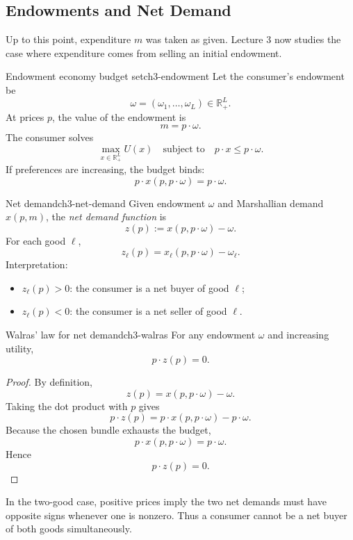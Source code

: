 \subsection{Endowments and Net Demand}

Up to this point, expenditure $m$ was taken as given. Lecture 3 now studies the case where expenditure comes from selling an initial endowment.

\begin{definition}{Endowment economy budget set}{ch3-endowment}
Let the consumer's endowment be
\[
\omega=(\omega_1,\dots,\omega_L)\in \mathbb{R}_+^L.
\]
At prices $p$, the value of the endowment is
\[
m=p\cdot \omega.
\]
The consumer solves
\[
\max_{x\in \mathbb{R}_+^L} U(x)
\quad \text{subject to} \quad
p\cdot x \le p\cdot \omega.
\]
If preferences are increasing, the budget binds:
\[
p\cdot x(p,p\cdot \omega)=p\cdot \omega.
\]
\end{definition}

\begin{definition}{Net demand}{ch3-net-demand}
Given endowment $\omega$ and Marshallian demand $x(p,m)$, the \emph{net demand function} is
\[
z(p):=x(p,p\cdot \omega)-\omega.
\]
For each good $\ell$,
\[
z_\ell(p)=x_\ell(p,p\cdot \omega)-\omega_\ell.
\]
Interpretation:
\begin{itemize}
    \item $z_\ell(p)>0$: the consumer is a net buyer of good $\ell$;
    \item $z_\ell(p)<0$: the consumer is a net seller of good $\ell$.
\end{itemize}
\end{definition}

\begin{theorem}{Walras' law for net demand}{ch3-walras}
For any endowment $\omega$ and increasing utility,
\[
p\cdot z(p)=0.
\]
\end{theorem}

\begin{proof}
By definition,
\[
z(p)=x(p,p\cdot \omega)-\omega.
\]
Taking the dot product with $p$ gives
\[
p\cdot z(p)
=
p\cdot x(p,p\cdot \omega)-p\cdot \omega.
\]
Because the chosen bundle exhausts the budget,
\[
p\cdot x(p,p\cdot \omega)=p\cdot \omega.
\]
Hence
\[
p\cdot z(p)=0.
\]
\end{proof}

In the two-good case, positive prices imply the two net demands must have opposite signs whenever one is nonzero. Thus a consumer cannot be a net buyer of both goods simultaneously.

